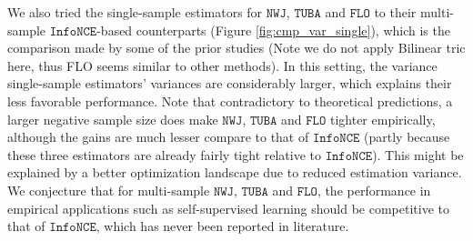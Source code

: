 \documentclass{article}
\theoremstyle{plain}
\theoremstyle{definition}
\theoremstyle{remark}
\newcommand{\infonce}{\texttt{InfoNCE}}
\newcommand{\TUBA}{\texttt{TUBA}}
\newcommand{\NWJ}{\texttt{NWJ}}
\newcommand{\FLO}{\texttt{FLO}}
\begin{document}
		
		We also tried the single-sample estimators for $\NWJ$, $\TUBA$ and $\FLO$ to their multi-sample $\infonce$-based counterparts (Figure \ref{fig:cmp_var_single}), which is the comparison made by some of the prior studies (Note we do not apply Bilinear tric here, thus FLO seems similar to other methods). In this setting, the variance single-sample estimators' variances are considerably larger, which explains their less favorable performance. Note that contradictory to theoretical predictions, a larger negative sample size does make $\NWJ$, $\TUBA$ and $\FLO$ tighter empirically, although the gains are much lesser compare to that of $\infonce$  (partly because these three estimators are already fairly tight relative to $\infonce$). This might be explained by a better optimization landscape due to reduced estimation variance. We conjecture that for multi-sample $\NWJ$, $\TUBA$ and $\FLO$, the performance in empirical applications such as self-supervised learning should be competitive to that of $\infonce$, which has never been reported in literature. 
		
		
		
		
		
		
\end{document}
